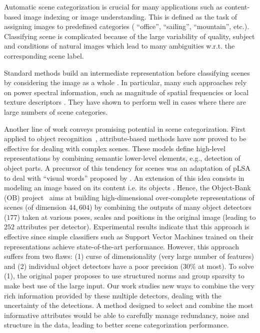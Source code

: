 \documentclass[runningheads,a4paper]{llncs}
\begin{document}
Automatic scene categorization is crucial for many applications such
as content-based image indexing \citep{Smeulders:2000} or image
understanding.
%
This is defined as the task of assigning images to predefined
categories ( ``office'', ``sailing'', ``mountain'', etc.).
%
Classifying scene is complicated because of the large variability of
quality, subject and conditions of natural images which lead to many
ambiguities w.r.t. the corresponding scene label.

Standard methods build an intermediate representation before
classifying scenes by considering the image as a whole
\citep{Torralba03,Vogel:2004,FeiFei:2005,Oliva06}. In particular, many
such approaches rely on power spectral information, such as
magnitude of spatial frequencies \citep{Oliva06} or local texture
descriptors \citep{FeiFei:2005}.
%
They have shown to perform well in cases where there are large
numbers of scene categories.

Another line of work conveys promising potential in scene categorization.
%
First applied to object recognition~\citep{Farhadi:2009}, attribute-based
methods have now proved to be effective for dealing with complex scenes.
%
These models define high-level representations by combining semantic
lower-level elements, e.g., detection of object parts.
%
A precursor of this tendency for scenes was an adaptation of
pLSA~\citep{Hofmann:2001} to deal with ``visual words'' proposed by
\citep{Bosh:2006}. 
%
An extension of this idea consists in modeling an image based on its content
i.e. its objects \citep{Espinace10ICRA,LiJiaLi10}. Hence, the Object-Bank (OB)
project~\citep{LiSuLimFeiFei} aims at building high-dimensional over-complete
representations of scenes (of dimension $44,604$) by combining the outputs of
many object detectors ($177$) taken at various poses, scales and positions in
the original image (leading to $252$ attributes per detector).
%
Experimental results indicate that this approach is effective since simple
classifiers such as Support Vector Machines trained on their representations
achieve state-of-the-art performance.
%
However, this approach suffers from two flaws: (1) curse of dimensionality
(very large number of features) and (2) individual object detectors have a poor
precision (30\% at most).
%
%
To solve (1), the original paper proposes to use structured norms and group
sparsity to make best use of the large input.
%
%
Our work studies new ways to combine the very rich information provided by
these multiple detectors, dealing with the uncertainty of the detections.
%
A method designed to select and combine the most informative attributes would
be able to carefully manage redundancy, noise and structure in the data,
leading to better scene categorization performance.
\end{document}
